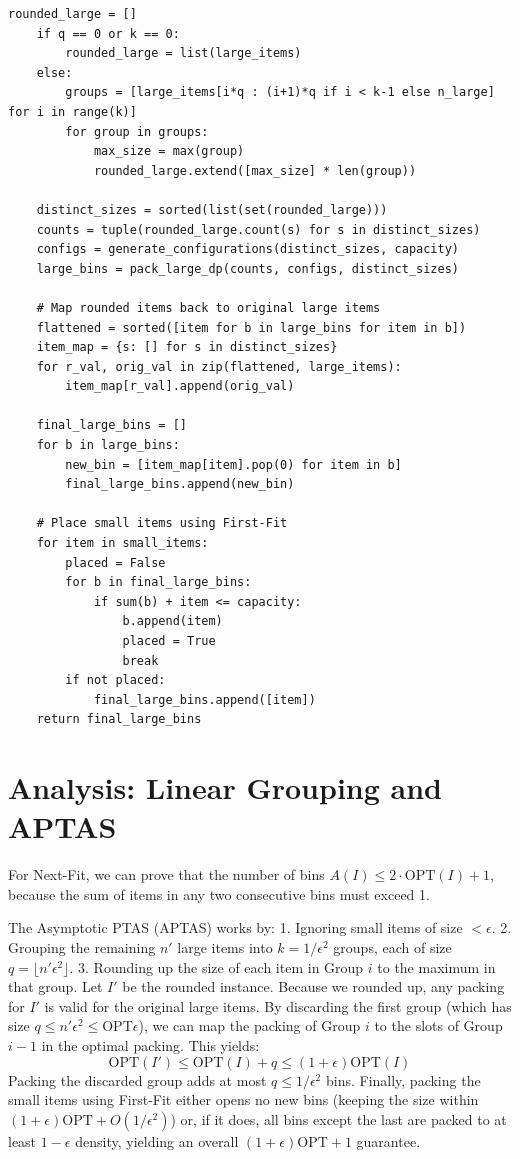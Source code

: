 \begin{lstlisting}[style=python, caption=Asymptotic PTAS for Bin Packing]
    rounded_large = []
    if q == 0 or k == 0:
        rounded_large = list(large_items)
    else:
        groups = [large_items[i*q : (i+1)*q if i < k-1 else n_large] for i in range(k)]
        for group in groups:
            max_size = max(group)
            rounded_large.extend([max_size] * len(group))
            
    distinct_sizes = sorted(list(set(rounded_large)))
    counts = tuple(rounded_large.count(s) for s in distinct_sizes)
    configs = generate_configurations(distinct_sizes, capacity)
    large_bins = pack_large_dp(counts, configs, distinct_sizes)
    
    # Map rounded items back to original large items
    flattened = sorted([item for b in large_bins for item in b])
    item_map = {s: [] for s in distinct_sizes}
    for r_val, orig_val in zip(flattened, large_items):
        item_map[r_val].append(orig_val)
        
    final_large_bins = []
    for b in large_bins:
        new_bin = [item_map[item].pop(0) for item in b]
        final_large_bins.append(new_bin)
        
    # Place small items using First-Fit
    for item in small_items:
        placed = False
        for b in final_large_bins:
            if sum(b) + item <= capacity:
                b.append(item)
                placed = True
                break
        if not placed:
            final_large_bins.append([item])
    return final_large_bins
\end{lstlisting}

\section{Analysis: Linear Grouping and APTAS}
For Next-Fit, we can prove that the number of bins $A(I) \le 2 \cdot \text{OPT}(I) + 1$, because the sum of items in any two consecutive bins must exceed 1.

The Asymptotic PTAS (APTAS) works by:
1.  Ignoring small items of size $< \epsilon$.
2.  Grouping the remaining $n'$ large items into $k = 1/\epsilon^2$ groups, each of size $q = \lfloor n'\epsilon^2 \rfloor$.
3.  Rounding up the size of each item in Group $i$ to the maximum in that group.
Let $I'$ be the rounded instance. Because we rounded up, any packing for $I'$ is valid for the original large items. By discarding the first group (which has size $q \le n'\epsilon^2 \le \text{OPT}\epsilon$), we can map the packing of Group $i$ to the slots of Group $i-1$ in the optimal packing. This yields:
\[
\text{OPT}(I') \le \text{OPT}(I) + q \le (1 + \epsilon)\text{OPT}(I)
\]
Packing the discarded group adds at most $q \le 1/\epsilon^2$ bins. Finally, packing the small items using First-Fit either opens no new bins (keeping the size within $(1+\epsilon)\text{OPT} + O(1/\epsilon^2)$) or, if it does, all bins except the last are packed to at least $1-\epsilon$ density, yielding an overall $(1+\epsilon)\text{OPT} + 1$ guarantee.


